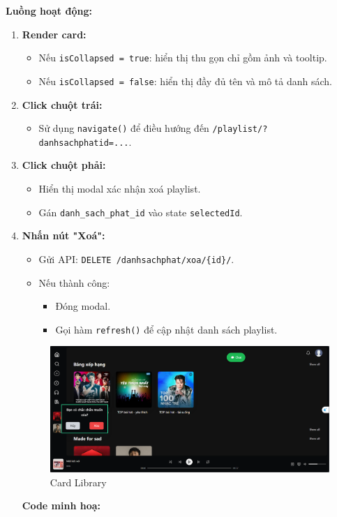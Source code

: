 \textbf{Luồng hoạt động:}
\begin{enumerate}
  \item \textbf{Render card:}
  \begin{itemize}
    \item Nếu \texttt{isCollapsed = true}: hiển thị thu gọn chỉ gồm ảnh và tooltip.
    \item Nếu \texttt{isCollapsed = false}: hiển thị đầy đủ tên và mô tả danh sách.
  \end{itemize}

  \item \textbf{Click chuột trái:}
  \begin{itemize}
    \item Sử dụng \texttt{navigate()} để điều hướng đến \texttt{/playlist/?danhsachphatid=...}.
  \end{itemize}

  \item \textbf{Click chuột phải:}
  \begin{itemize}
    \item Hiển thị modal xác nhận xoá playlist.
    \item Gán \texttt{danh\_sach\_phat\_id} vào state \texttt{selectedId}.
  \end{itemize}

  \item \textbf{Nhấn nút "Xoá":}
  \begin{itemize}
    \item Gửi API: \texttt{DELETE /danhsachphat/xoa/\{id\}/}.
    \item Nếu thành công:
    \begin{itemize}
      \item Đóng modal.
      \item Gọi hàm \texttt{refresh()} để cập nhật danh sách playlist.
    \end{itemize}
  \end{itemize}
  \begin{figure}[H]
    \centering
    \includegraphics[width=1\textwidth]{imgs/trienkhaife/xoaplaylist.png}
    \caption{Card Library}
  \end{figure}
  \textbf{Code minh hoạ:}


\end{enumerate}
